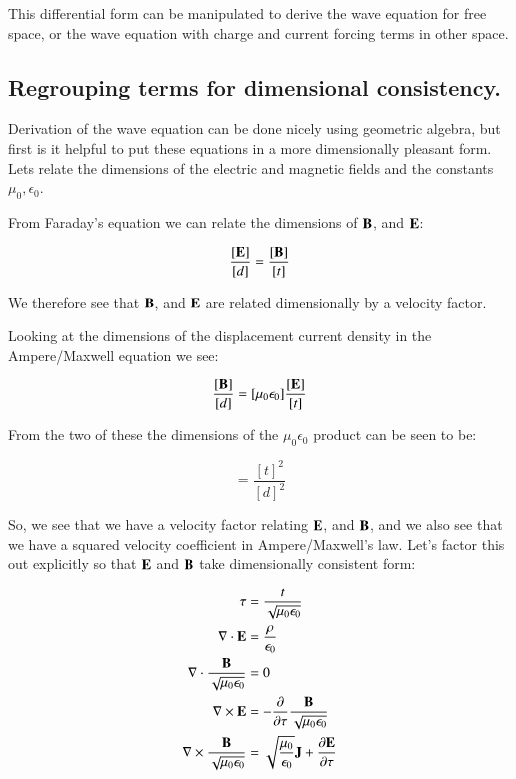 \documentclass{article}      %
\newcommand{\grad}[0]{\nabla}
\begin{document}
This differential form can be manipulated to derive the wave equation for free space, or the wave equation with charge and current forcing terms in other space.

\subsection{ Regrouping terms for dimensional consistency. }

Derivation of the wave equation can be done nicely using geometric algebra, but first is it helpful to put these equations in a more dimensionally pleasant form.
Lets relate the dimensions of the electric and magnetic fields and the constants $\mu_0, \epsilon_0$.

From Faraday's equation we can relate the dimensions of
$\mathbf{B}$, and $\mathbf{E}$:

\begin{equation}
\frac{[\mathbf{E}]}{[d]} = \frac{[\mathbf{B}]}{[t]}
\end{equation}

We therefore see that $\mathbf{B}$, and $\mathbf{E}$ are related dimensionally by a velocity factor.

Looking at the dimensions of the displacement current density in the Ampere/Maxwell equation we see:

\begin{equation}
\frac{[\mathbf{B}]}{[d]} = [\mu_0\epsilon_0] \frac{[\mathbf{E}]}{[t]}
\end{equation}

From the two of these the dimensions of the $\mu_0\epsilon_0$ product can be seen to be:

\begin{equation}
[\mu_0\epsilon_0] = \frac{{[t]}^2}{{[d]}^2}
\end{equation}

So, we see that we have a velocity factor relating $\mathbf{E}$, and $\mathbf{B}$, and we also see that we have a squared velocity coefficient in Ampere/Maxwell's law.  Let's factor this out explicitly so that $\mathbf{E}$ and $\mathbf{B}$ take dimensionally consistent form:

\begin{align}
\tau &= \frac{t}{\sqrt{\mu_0\epsilon_0}}  \\
\grad \cdot \BE &= \frac{\rho}{\epsilon_0} \\
\grad \cdot \frac{\BB}{\sqrt{\mu_0\epsilon_0}} &= 0 \\
\grad \cross \BE &= - \frac{\partial}{\partial \tau} \frac{\BB}{\sqrt{\mu_0\epsilon_0}} \\
\grad \cross \frac{\BB}{\sqrt{\mu_0\epsilon_0}} &= \sqrt{\frac{\mu_0}{\epsilon_0}} \BJ + \frac{\partial \BE}{\partial \tau}
\end{align}
\end{document}
